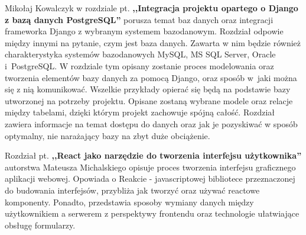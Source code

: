 \documentclass[oneside,polski,logo,indent]{amuthesis}
\begin{document}
Mikołaj Kowalczyk w rozdziale pt. \textbf{,,Integracja projektu opartego o Django z bazą danych PostgreSQL''} porusza temat baz danych oraz integracji frameworka Django z wybranym systemem bazodanowym. Rozdział odpowie między innymi na pytanie,  czym jest baza danych.  Zawarta w nim będzie również charakterystyka systemów bazodanowych MySQL, MS SQL Server, Oracle i~PostgreSQL. W rozdziale tym opisany zostanie proces modelowania oraz tworzenia elementów bazy danych za pomocą Django, oraz sposób w~jaki można się z nią komunikować. Wszelkie przykłady opierać się będą na podstawie bazy utworzonej na potrzeby projektu. Opisane zostaną wybrane modele oraz relacje między tabelami, dzięki którym projekt zachowuje spójną całość. Rozdział zawiera informacje na temat dostępu do danych oraz jak je pozyskiwać w sposób optymalny, nie narażający bazy na zbyt duże obciążenie.
 
Rozdział pt. \textbf{,,React jako narzędzie do tworzenia interfejsu użytkownika''} autorstwa Mateusza Michalskiego opisuje proces tworzenia interfejsu graficznego aplikacji webowej. Opowiada o Reakcie - javascriptowej bibliotece przeznaczonej do budowania interfejsów, przybliża jak tworzyć oraz używać reactowe komponenty. Ponadto, przedstawia sposoby wymiany danych między użytkownikiem a serwerem z perspektywy frontendu oraz technologie ułatwiające obsługę formularzy.
\end{document}
